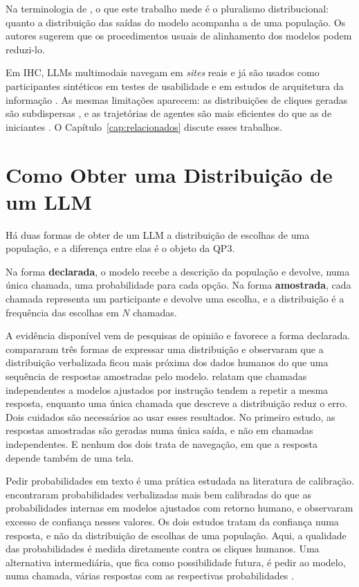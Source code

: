 \documentclass[12pt,oneside,a4paper,chapter=TITLE,english,brazil]{abntex2}
\begin{document}
Na terminologia de , o que este trabalho mede é o pluralismo distribucional: quanto a distribuição das saídas do modelo acompanha a de uma população. Os autores sugerem que os procedimentos usuais de alinhamento dos modelos podem reduzi-lo.

Em IHC, LLMs multimodais navegam em \textit{sites} reais \cite{deng2023mind2web,zhou2024webarena} e já são usados como participantes sintéticos em testes de usabilidade \cite{lu2025uxagent,tan2026avenirux,chowdhury2026amuser} e em estudos de arquitetura da informação \cite{kuric2025cardsorting}. As mesmas limitações aparecem: as distribuições de cliques geradas são subdispersas \cite{kuric2026wwgc}, e as trajetórias de agentes são mais eficientes do que as de iniciantes \cite{zhong2025syntheticcw}. O Capítulo~\ref{cap:relacionados} discute esses trabalhos.

\section{Como Obter uma Distribuição de um LLM}
\label{sec:elicitacao}

Há duas formas de obter de um LLM a distribuição de escolhas de uma população, e a diferença entre elas é o objeto da QP3.

Na forma \textbf{declarada}, o modelo recebe a descrição da população e devolve, numa única chamada, uma probabilidade para cada opção. Na forma \textbf{amostrada}, cada chamada representa um participante e devolve uma escolha, e a distribuição é a frequência das escolhas em $N$ chamadas.

A evidência disponível vem de pesquisas de opinião e favorece a forma declarada.  compararam três formas de expressar uma distribuição e observaram que a distribuição verbalizada ficou mais próxima dos dados humanos do que uma sequência de respostas amostradas pelo modelo.  relatam que chamadas independentes a modelos ajustados por instrução tendem a repetir a mesma resposta, enquanto uma única chamada que descreve a distribuição reduz o erro. Dois cuidados são necessários ao usar esses resultados. No primeiro estudo, as respostas amostradas são geradas numa única saída, e não em chamadas independentes. E nenhum dos dois trata de navegação, em que a resposta depende também de uma tela.

Pedir probabilidades em texto é uma prática estudada na literatura de calibração.  encontraram probabilidades verbalizadas mais bem calibradas do que as probabilidades internas em modelos ajustados com retorno humano, e  observaram excesso de confiança nesses valores. Os dois estudos tratam da confiança numa resposta, e não da distribuição de escolhas de uma população. Aqui, a qualidade das probabilidades é medida diretamente contra os cliques humanos. Uma alternativa intermediária, que fica como possibilidade futura, é pedir ao modelo, numa chamada, várias respostas com as respectivas probabilidades \cite{zhang2025verbalizedsampling}.
\end{document}
